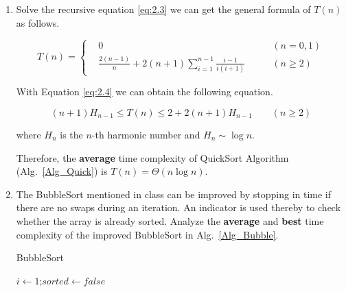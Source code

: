 \documentclass[12pt,a4paper]{article}
\makeatletter
\newtheorem*{solution}{Solution}
\theoremstyle{definition}
\renewenvironment{solution}[1][Solution] {\par\pushQED{\qed}\normalfont\topsep6\p@\@plus6\p@\relax\trivlist\item[\hskip\labelsep\bfseries#1\@addpunct{.}]\ignorespaces}{\popQED\endtrivlist\@endpefalse} \makeatother
\makeatother
\begin{document}
\begin{enumerate}
\begin{solution}
        Solve the recursive equation \eqref{eq:2.3} we can get the general formula of $T(n)$ as follows.

        \begin{equation}
        T(n) = \left\{
        \begin{aligned}
            & 0 & \quad \quad (n = 0, 1) \\
            & \frac{2(n-1)}{n} + 2(n+1)\sum_{i=1}^{n-1} \frac{i-1}{i(i+1)} & \quad \quad (n \geq 2)
        \end{aligned}
        \right.
        \label{eq:2.4}
        \end{equation}

        With Equation \eqref{eq:2.4} we can obtain the following equation.

        \begin{equation}
        (n+1)H_{n-1} \leq T(n) \leq 2 + 2(n+1)H_{n-1}  \quad \quad (n \geq 2)
        \end{equation}

        where $H_n$ is the $n$-th harmonic number and $H_n \sim \log{n}$.

        Therefore, the \textbf{average} time complexity of QuickSort Algorithm (Alg.~\ref{Alg_Quick}) is $T(n) = \Theta(n \log{n})$.
    \end{solution}

    \item
    The BubbleSort mentioned in class can be improved by stopping in time if there are no swaps during an iteration. An indicator is used thereby to check whether the array is already sorted. Analyze the \textbf{average} and \textbf{best} time complexity of the improved BubbleSort in Alg.~\ref{Alg_Bubble}.

    \begin{minipage}[t]{0.8\textwidth}
    \begin{algorithm}[H]

        \BlankLine
        \caption{BubbleSort}\label{Alg_Bubble}

        $i\leftarrow 1$;$sorted\leftarrow false$\;

    \end{algorithm}
    \end{minipage}


\end{enumerate}
\end{document}
